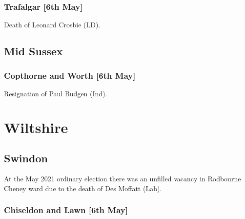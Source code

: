 \documentclass[a4paper,openany]{book}
\begin{document}
\begin{resultsiii}
\subsubsection*{Trafalgar \hspace*{\fill}\nolinebreak[1]%
	\enspace\hspace*{\fill}
	[6th May]}


Death of Leonard Crosbie (LD).

\subsection*{Mid Sussex}

\subsubsection*{Copthorne and Worth \hspace*{\fill}\nolinebreak[1]%
	\enspace\hspace*{\fill}
	[6th May]}


Resignation of Paul Budgen (Ind).

\section{Wiltshire}

\subsection*{Swindon}

At the May 2021 ordinary election there was an unfilled vacancy in Rodbourne Cheney ward due to the death of Des Moffatt (Lab).

\subsubsection*{Chiseldon and Lawn \hspace*{\fill}\nolinebreak[1]%
	\enspace\hspace*{\fill}
	[6th May]}



\end{resultsiii}
\end{document}
